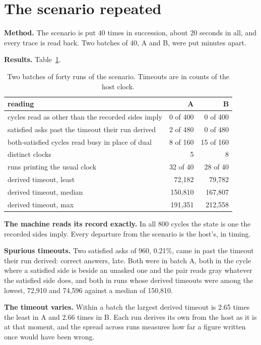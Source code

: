 \section{The scenario repeated}
\label{sec:repeat}

\textbf{Method.} The scenario is put 40 times in succession, about 20 seconds in all, and every
trace is read back. Two batches of 40, A and B, were put minutes apart.

\textbf{Results.} Table~\ref{tab:repeat}.

\begin{table}[h]
\centering
\small
\begin{tabular}{@{}l r r@{}}
\toprule
reading & A & B \\
\midrule
cycles read as other than the recorded sides imply & 0 of 400 & 0 of 400 \\
satisfied asks past the timeout their run derived & 2 of 480 & 0 of 480 \\
both-satisfied cycles read busy in place of dual & 8 of 160 & 15 of 160 \\
distinct clocks & 5 & 8 \\
runs printing the usual clock & 32 of 40 & 28 of 40 \\
derived timeout, least & 72,182 & 79,782 \\
derived timeout, median & 150,810 & 167,807 \\
derived timeout, max & 191,351 & 212,558 \\
\bottomrule
\end{tabular}
\caption{Two batches of forty runs of the scenario. Timeouts are in counts of the host clock.}
\label{tab:repeat}
\end{table}

\textbf{The machine reads its record exactly.} In all 800 cycles the state is one the recorded
sides imply. Every departure from the scenario is the host's, in timing.

\textbf{Spurious timeouts.} Two satisfied asks of 960, 0.21\%, came in past the timeout their run
derived: correct answers, late. Both were in batch A, both in the cycle where a satisfied side is
beside an unasked one and the pair reads gray whatever the satisfied side does, and both in runs whose
derived timeouts were among the lowest, 72,910 and 74,596 against a median of 150,810.

\textbf{The timeout varies.} Within a batch the largest derived timeout is 2.65 times the least in
A and 2.66 times in B. Each run derives its own from the host as it is at that moment, and the
spread across runs measures how far a figure written once would have been wrong.

